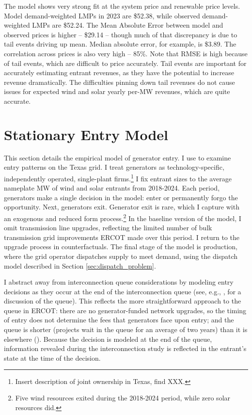 \documentclass[12pt]{article}
\begin{document}
The model shows very strong fit at the system price and renewable price levels. Model demand-weighted LMPs in 2023 are \$52.38, while observed demand-weighted LMPs are \$52.24. The Mean Absolute Error between model and observed prices is higher -- \$29.14 -- though much of that discrepancy is due to tail events driving up mean. Median absolute error, for example, is \$3.89. The correlation across prices is also very high -- 85\%. Note that RMSE is high because of tail events, which are difficult to price accurately. Tail events are important for accurately estimating entrant revenues, as they have the potential to increase revenue dramatically. The difficulties pinning down tail revenues do not cause issues for expected wind and solar yearly per-MW revenues, which are quite accurate. 

\section{Stationary Entry Model}
\label{sec:entry_model}
This section details the empirical model of generator entry. I use to examine entry patterns on the Texas grid. I treat generators as technology-specific, independently operated, single-plant firms.\footnote{Insert description of joint ownership in Texas, \cite{JohnstonLiuYang2024} find XXX.} I fix entrant sizes to the average nameplate MW of wind and solar entrants from 2018-2024. Each period, generators make a single decision in the model: enter or permanently forgo the opportunity. Next, generators exit. Generator exit is rare, which I capture with an exogenous and reduced form process.\footnote{Five wind resources exited during the 2018-2024 period, while zero solar resources did.} In the baseline version of the model, I omit transmission line upgrades, reflecting the limited number of bulk transmission grid improvements ERCOT made over this period. I return to the upgrade process in counterfactuals. The final stage of the model is production, where the grid operator dispatches supply to meet demand, using the dispatch model described in Section \ref{sec:dispatch_problem}. 

I abstract away from interconnection queue considerations by modeling entry decisions as they occur at the end of the interconnection queue (see, e.g., \cite{JohnstonLiuYang2024}, \cite{Boatwright2025} for a discussion of the queue). This reflects the more straightforward approach to the queue in ERCOT: there are no generator-funded network upgrades, so the timing of entry does not determine the fees that generators face upon entry; and the queue is shorter (projects wait in the queue for an average of two years) than it is elsewhere (\cite{LBNL2024}). Because the decision is modeled at the end of the queue, information revealed during the interconnection study is reflected in the entrant's state at the time of the decision.
\end{document}
